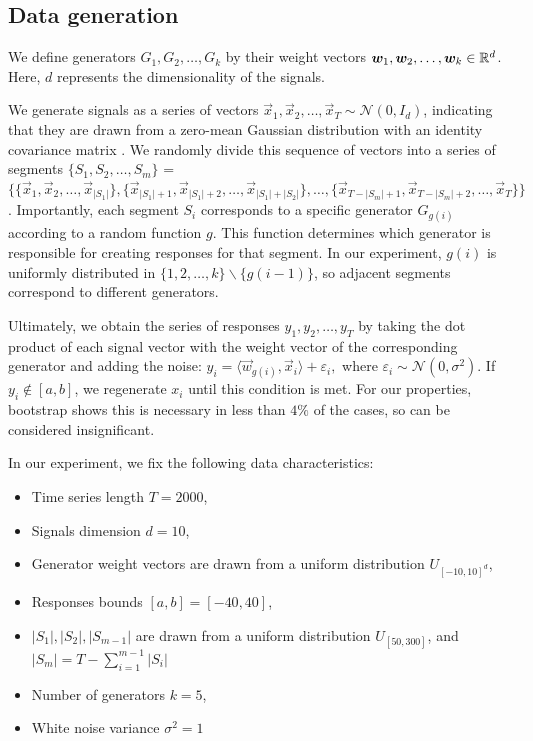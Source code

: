 \documentclass[12pt, twoside]{article}
\begin{document}
\subsection{Data generation}

We define generators $G_1, G_2, \dots, G_k$ by their weight vectors $\boldsymbol{w}_1, \boldsymbol{w}_2, \dots, \boldsymbol{w}_k \in \mathbb{R}^d$. 
Here, $d$ represents the dimensionality of the signals.

We generate signals as a series of vectors $\vec x_1, \vec x_2, \dots, \vec x_T \sim \mathcal{N}(0, I_d)$, indicating that they are drawn from a zero-mean Gaussian distribution with an identity covariance matrix .
We randomly divide this sequence of vectors into a series of segments $\{S_1, S_2, \dots, S_m\}$ = $\{\{ \vec x_1, \vec x_2, \dots, \vec x_{|S_1|}\}, \{\vec x_{|S_1|+1}, \vec x_{|S_1|+2}, \dots, \vec x_{|S_1| + |S_2|}\}, \dots, \{\vec x_{T-|S_m|+1}, \vec x_{T-|S_m|+2}, \dots, \vec x_{T}\}\}$. 
Importantly, each segment $S_i$ corresponds to a specific generator $G_{g(i)}$ according to a random function $g$. 
This function determines which generator is responsible for creating responses for that segment. In our experiment, $g(i)$ is uniformly distributed in $\{1, 2, \dots, k\} \backslash \{g(i-1)\}$, so adjacent segments correspond to different generators.

Ultimately, we obtain the series of responses $y_1, y_2, \dots, y_T$ by taking the dot product of each signal vector with the weight vector of the corresponding  generator and adding the noise: $y_i = \langle \vec w_{g(i)}, \vec x_i \rangle + \varepsilon_i,$ where $\varepsilon_i \sim \mathcal{N}(0, \sigma^2)$. If $y_i  \notin [a, b]$, we regenerate $x_i$ until this condition is met. For our properties, bootstrap shows this is necessary in less than $4\%$ of the cases, so can be considered insignificant.
\vspace{2mm}

In our experiment, we fix the following data characteristics:
\begin{itemize}
\item Time series length $T = 2000$,
\item Signals dimension $d=10$,
\item Generator weight vectors are drawn from a uniform distribution $U_{[-10, 10]^d}$,
\item Responses bounds $[a, b] = [-40, 40]$,
\item $|S_1|, |S_2|, |S_{m-1}|$ are drawn from a uniform distribution $U_{[50, 300]}$, and $|S_m| = T-\sum_{i=1}^{m-1}|S_i|$
\item Number of generators $k = 5$,
\item White noise variance $\sigma^2= 1$
\end{itemize}
\end{document}

